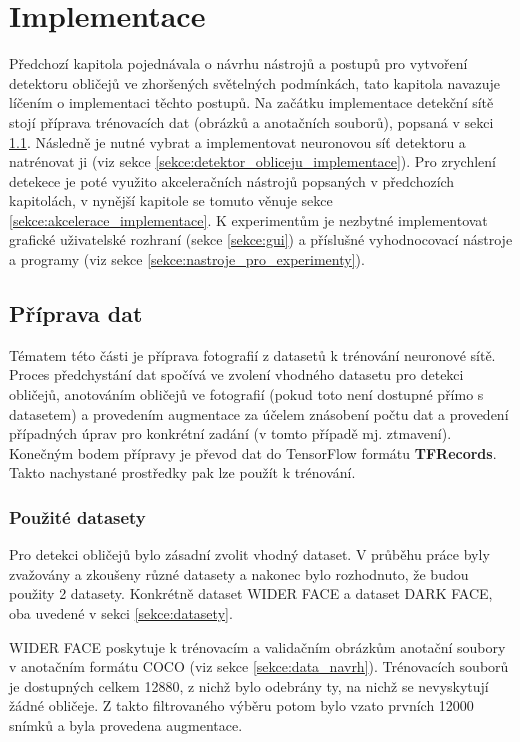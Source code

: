\chapter{Implementace}
\label{kapitola:implementace}
Předchozí kapitola pojednávala o návrhu nástrojů a postupů pro vytvoření detektoru obličejů ve zhoršených světelných podmínkách, tato kapitola navazuje líčením o implementaci těchto postupů. Na začátku implementace detekční sítě stojí příprava trénovacích dat (obrázků a anotačních souborů), popsaná v sekci \ref{sekce:priprava_dat}. Následně je nutné vybrat a implementovat neuronovou síť detektoru a natrénovat ji (viz sekce \ref{sekce:detektor_obliceju_implementace}). Pro zrychlení detekece je poté využito akceleračních nástrojů popsaných v předchozích kapitolách, v nynější kapitole se tomuto věnuje sekce \ref{sekce:akcelerace_implementace}. K experimentům je nezbytné implementovat grafické uživatelské rozhraní (sekce \ref{sekce:gui}) a příslušné vyhodnocovací nástroje a programy (viz sekce \ref{sekce:nastroje_pro_experimenty}).

\section{Příprava dat}
\label{sekce:priprava_dat}
Tématem této části je příprava fotografií z datasetů k trénování neuronové sítě. Proces předchystání dat spočívá ve zvolení vhodného datasetu pro detekci obličejů, anotováním obličejů ve fotografií (pokud toto není dostupné přímo s datasetem) a provedením augmentace za účelem znásobení počtu dat a provedení případných úprav pro konkrétní zadání (v tomto případě mj. ztmavení). Konečným bodem přípravy je převod dat do TensorFlow formátu \textbf{TFRecords}. Takto nachystané prostředky pak lze použít k trénování.

\subsection*{Použité datasety}
Pro detekci obličejů bylo zásadní zvolit vhodný dataset. V průběhu práce byly zvažovány a zkoušeny různé datasety a nakonec bylo rozhodnuto, že budou použity 2 datasety. Konkrétně dataset WIDER FACE a dataset DARK FACE, oba uvedené v sekci \ref{sekce:datasety}.

WIDER FACE poskytuje k trénovacím a validačním obrázkům anotační soubory v anotačním formátu COCO (viz sekce \ref{sekce:data_navrh}). Trénovacích souborů je dostupných celkem 12880, z nichž bylo odebrány ty, na nichž se nevyskytují žádné obličeje. Z takto filtrovaného výběru potom bylo vzato prvních 12000 snímků a byla provedena augmentace.

